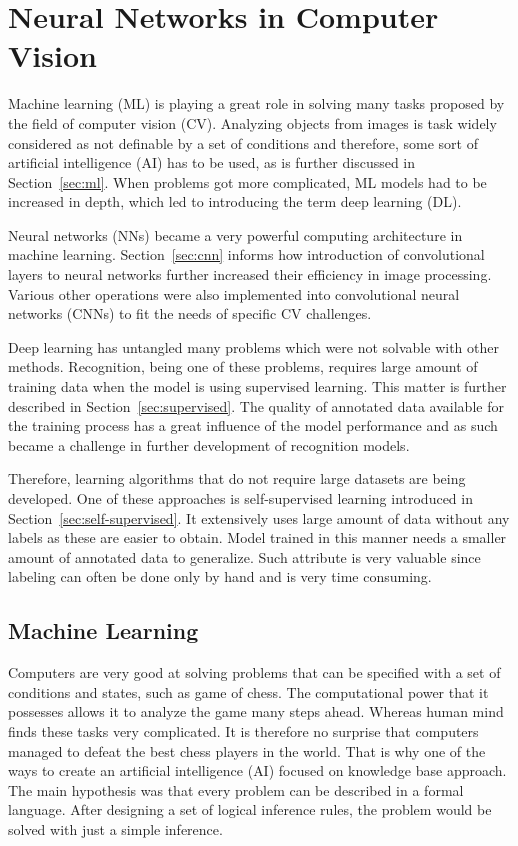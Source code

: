 \chapter{\label{chap:nn-in-cv}Neural Networks in Computer Vision}

Machine learning (ML) is playing a great role in solving many tasks proposed by the field of computer vision (CV). Analyzing objects from images is task widely considered as not definable by a set of conditions and therefore, some sort of artificial intelligence (AI) has to be used, as is further discussed in Section~\ref{sec:ml}. When problems got more complicated, ML models had to be increased in depth, which led to introducing the term deep learning (DL). 

Neural networks (NNs) became a very powerful computing architecture in machine learning. Section~\ref{sec:cnn} informs how introduction of convolutional layers to neural networks further increased their efficiency in image processing. Various other operations were also implemented into convolutional neural networks (CNNs) to fit the needs of specific CV challenges.

Deep learning has untangled many problems which were not solvable with other methods. Recognition, being one of these problems, requires large amount of training data when the model is using supervised learning. This matter is further described in Section~\ref{sec:supervised}. The quality of annotated data  available for the training process has a great influence of the model performance and as such became a challenge in further development of recognition models.

Therefore, learning algorithms that do not require large datasets are being developed. One of these approaches is self-supervised learning introduced in Section~\ref{sec:self-supervised}. It extensively uses large amount of data without any labels as these are easier to obtain. Model trained in this manner needs a smaller amount of annotated data to generalize. Such attribute is very valuable since labeling can often be done only by hand and is very time consuming.

\section{\label{sec:ml}Machine Learning}

Computers are very good at solving problems that can be specified with a set of conditions and states, such as game of chess. The computational power that it possesses allows it to analyze the game many steps ahead. Whereas human mind finds these tasks very complicated. It is therefore no surprise that computers managed to defeat the best chess players in the world. That is why one of the ways to create an artificial intelligence (AI) focused on knowledge base approach. The main hypothesis was that every problem can be described in a formal language. After designing a set of logical inference rules, the problem would be solved with just a simple inference.

